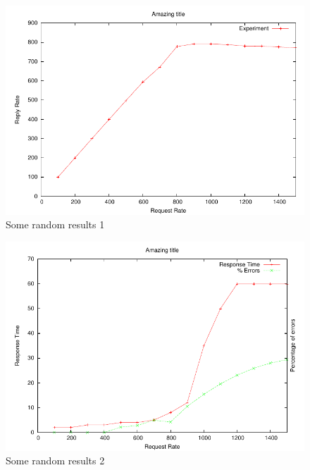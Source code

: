 \documentclass[a4paper, 11pt]{article}
\begin{document}
\begin{figure}
  \begin{center}
    \includegraphics{results1.pdf}
    \caption{Some random results 1}
    \label{fig:results1}
  \end{center}
\end{figure}


\begin{figure}
  \begin{center}
    \includegraphics{results2.pdf}
    \caption{Some random results 2}
    \label{fig:results2}
  \end{center}
\end{figure}
\end{document}
